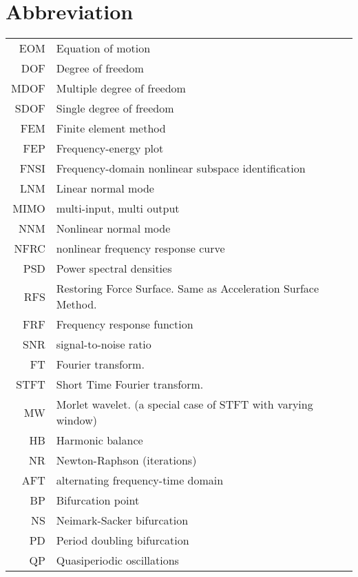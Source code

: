 
\chapter*{Abbreviation}
\label{chap:abbreviation}


\begin{center}
  \begin{tabular}{r l}
    \hline
    EOM & Equation of motion \\
    DOF & Degree of freedom \\
    MDOF & Multiple degree of freedom \\
    SDOF & Single degree of freedom \\
    FEM & Finite element method \\
    FEP & Frequency-energy plot \\
    FNSI & Frequency-domain nonlinear subspace identification\\
    LNM & Linear normal mode \\
    MIMO & multi-input, multi output\\
    NNM & Nonlinear normal mode \\
    NFRC & nonlinear frequency response curve\\
    PSD & Power spectral densities \\
    RFS & Restoring Force Surface. Same as Acceleration Surface Method.\\
    FRF & Frequency response function \\
    SNR & signal-to-noise ratio\\
    FT & Fourier transform. \\
    STFT & Short Time Fourier transform. \\
    MW & Morlet wavelet. (a special case of STFT with varying window) \\
    HB & Harmonic balance \\
    NR & Newton-Raphson (iterations) \\
    AFT & alternating frequency-time domain \\
    BP & Bifurcation point \\
    NS & Neimark-Sacker bifurcation \\
    PD & Period doubling bifurcation \\
    QP & Quasiperiodic oscillations \\
    \hline
  \end{tabular}
\end{center}

